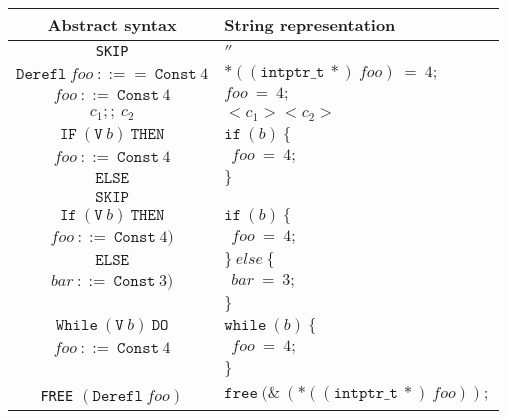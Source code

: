 \begin{table}[h!]
\centering
\begin{tabular}{|c|l|}
  \hline
  \textbf{Abstract syntax} & \textbf{String representation} \\ [0.5ex]
  \hline \hline
  \verb|SKIP| & $''$ \\
  \hline
  $\mathtt{Derefl}\ foo\ ::==\ \mathtt{Const}\ 4$                            & $*((\mathtt{intptr\_t}\ *)\ foo)\ =\ 4;$ \\
  \hline
  $foo\ ::=\ \mathtt{Const}\ 4$                                              & $foo\ =\ 4;$ \\
  \hline
  $c_1;;\ c_2$                                                               & $<c_1> <c_2>$ \\
  \hline
  $\mathtt{IF}\ (\mathtt{V}\ b)\ \mathtt{THEN}$                              & $\mathtt{if}\ (b)\ \{$\\
  $foo\ ::=\ \mathtt{Const}\ 4$                                              & $\ \ foo\ =\ 4;$ \\
  $\mathtt{ELSE}$                                                            &  $\}$ \\
  $\mathtt{SKIP}$                                                            & \\
  \hline
  $\mathtt{If}\ (\mathtt{V}\ b)\ \mathtt{THEN}$                              & $\mathtt{if}\ (b)\ \{$\\
  $foo\ ::=\ \mathtt{Const}\ 4)$                                             & $\ \ foo\ =\ 4;$ \\
  $\mathtt{ELSE}$                                                            & $\}\ else\ \{$ \\
  $bar\ ::=\ \mathtt{Const}\ 3)$                                             & $\ \ bar\ =\ 3;$ \\
                                                                             & $\}$ \\
  \hline
  $\mathtt{While}\ (\mathtt{V}\ b)\ \mathtt{DO}$                             & $\mathtt{while}\ (b)\ \{$\\
  $foo\ ::=\ \mathtt{Const}\ 4$                                              & $\ \ foo\ =\ 4;$ \\
                                                                             & $\}$ \\
  \hline
  \verb|FREE| $(\mathtt{Derefl}\ foo)$                                       & $\mathtt{free}\ (\&\ (*((\mathtt{intptr\_t}\ *)\ foo));$ \\

\end{tabular}
\end{table}
